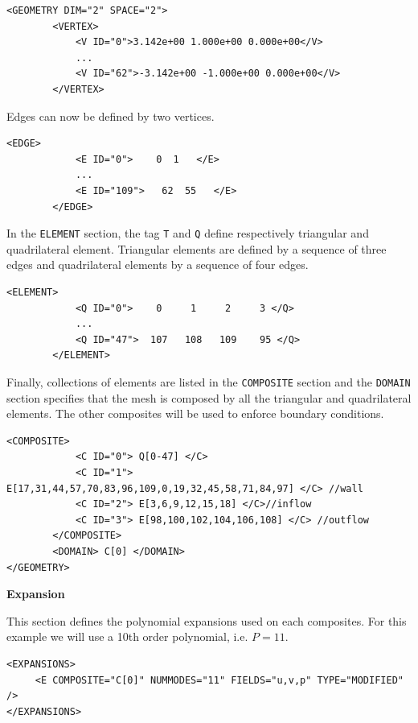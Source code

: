   \begin{lstlisting}[style=XMLStyle]
<GEOMETRY DIM="2" SPACE="2">
        <VERTEX>
            <V ID="0">3.142e+00 1.000e+00 0.000e+00</V>
            ...
            <V ID="62">-3.142e+00 -1.000e+00 0.000e+00</V>
        </VERTEX>
\end{lstlisting}

Edges can now be defined by two vertices.

  \begin{lstlisting}[style=XMLStyle]
<EDGE>
            <E ID="0">    0  1   </E>
            ...
            <E ID="109">   62  55   </E>
        </EDGE>
\end{lstlisting}


In the \texttt{ELEMENT} section, the tag \texttt{T} and \texttt{Q} define respectively triangular and quadrilateral element. Triangular elements are defined by a sequence of three edges and quadrilateral elements by a sequence of four edges.

  \begin{lstlisting}[style=XMLStyle]
        <ELEMENT>
            <Q ID="0">    0     1     2     3 </Q>
            ...
            <Q ID="47">  107   108   109    95 </Q>
        </ELEMENT>
        \end{lstlisting}

Finally, collections of elements are listed in the \texttt{COMPOSITE} section and the \texttt{DOMAIN} section specifies that the mesh is composed by all the triangular and quadrilateral elements. The other composites will be used to enforce boundary conditions. 

  \begin{lstlisting}[style=XMLStyle]
              <COMPOSITE>            
            <C ID="0"> Q[0-47] </C>
            <C ID="1"> E[17,31,44,57,70,83,96,109,0,19,32,45,58,71,84,97] </C> //wall
            <C ID="2"> E[3,6,9,12,15,18] </C>//inflow 
            <C ID="3"> E[98,100,102,104,106,108] </C> //outflow
        </COMPOSITE>
        <DOMAIN> C[0] </DOMAIN>
</GEOMETRY>
  \end{lstlisting}
              
  \textbf{Expansion}
  
  This section defines the polynomial expansions used on each composites. For this example we will use a 10th order polynomial, i.e. $P=11$.
  
  \begin{lstlisting}[style=XMLStyle]
<EXPANSIONS>
     <E COMPOSITE="C[0]" NUMMODES="11" FIELDS="u,v,p" TYPE="MODIFIED" />
</EXPANSIONS>
  \end{lstlisting}
  
